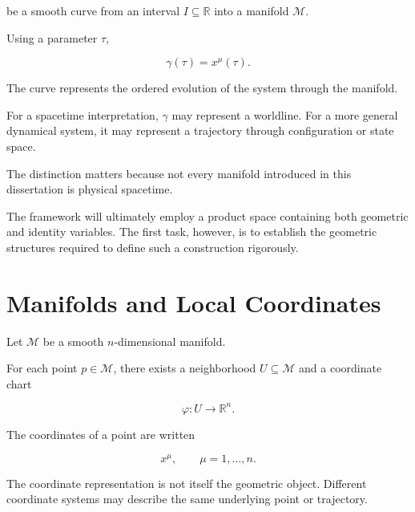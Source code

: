 \documentclass[12pt,oneside]{book}
\begin{document}
be a smooth curve from an interval
\(I\subseteq\mathbb{R}\) into a manifold \(\mathcal{M}\).

Using a parameter \(\tau\),

\begin{equation}
    \gamma(\tau)
    =
    x^\mu(\tau).
    \label{eq:worldline-coordinate-form}
\end{equation}

The curve represents the ordered evolution of the system through
the manifold.

For a spacetime interpretation, \(\gamma\) may represent a
worldline. For a more general dynamical system, it may represent
a trajectory through configuration or state space.

The distinction matters because not every manifold introduced
in this dissertation is physical spacetime.

The framework will ultimately employ a product space containing
both geometric and identity variables. The first task, however,
is to establish the geometric structures required to define such
a construction rigorously.


\section{Manifolds and Local Coordinates}
\label{sec:manifolds-local-coordinates}

Let \(\mathcal{M}\) be a smooth \(n\)-dimensional manifold.

For each point \(p\in\mathcal{M}\), there exists a neighborhood
\(U\subseteq\mathcal{M}\) and a coordinate chart

\begin{equation}
    \varphi:
    U
    \rightarrow
    \mathbb{R}^{n}.
    \label{eq:coordinate-chart}
\end{equation}

The coordinates of a point are written

\begin{equation}
    x^\mu,
    \qquad
    \mu=1,\ldots,n.
\end{equation}

The coordinate representation is not itself the geometric
object. Different coordinate systems may describe the same
underlying point or trajectory.
\end{document}
